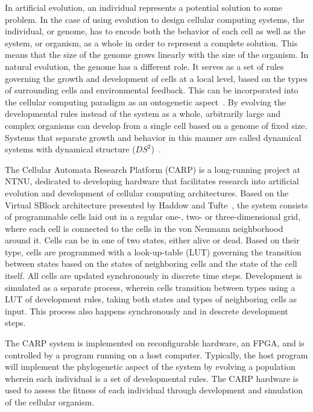 In artificial evolution, an individual represents a potential solution to some
problem. In the case of using evolution to design cellular computing systems,
the individual, or genome, has to encode both the behavior of each cell as well
as the system, or organism, as a whole in order to represent a complete
solution. This means that the size of the genome grows linearly with the size of
the organism. In natural evolution, the genome has a different role. It serves
as a set of rules governing the growth and development of cells at a local
level, based on the types of surrounding cells and environmental feedback. This
can be incorporated into the cellular computing paradigm as an ontogenetic
aspect~\cite{Tufte2005a}. By evolving the developmental rules instead of the
system as a whole, arbitrarily large and complex organisms can develop from a
single cell based on a genome of fixed size. Systems that separate growth and
behavior in this manner are called dynamical systems with dynamical structure
($DS^2$)~\cite{Tufte2016}.

The Cellular Automata Research Platform (CARP) is a long-running project at
NTNU, dedicated to developing hardware that facilitates research into artificial
evolution and development of cellular computing architectures. Based on the
Virtual SBlock architecture presented by Haddow and Tufte~\cite{Haddow2000a},
the system consists of programmable cells laid out in a regular one-, two- or
three-dimensional grid, where each cell is connected to the cells in the von
Neumann neighborhood around it. Cells can be in one of two states, either alive
or dead. Based on their type, cells are programmed with a look-up-table (LUT)
governing the transition between states based on the states of neighboring cells
and the state of the cell itself. All cells are updated synchronously in
discrete time steps. Development is simulated as a separate process, wherein
cells transition between types using a LUT of development rules, taking both
states and types of neighboring cells as input. This process also happens
synchronously and in descrete development steps.

The CARP system is implemented on reconfigurable hardware, an FPGA, and is
controlled by a program running on a host computer. Typically, the host program
will implement the phylogenetic aspect of the system by evolving a population
wherein each individual is a set of developmental rules. The CARP hardware is
used to assess the fitness of each individual through development and simulation
of the cellular organism. 

